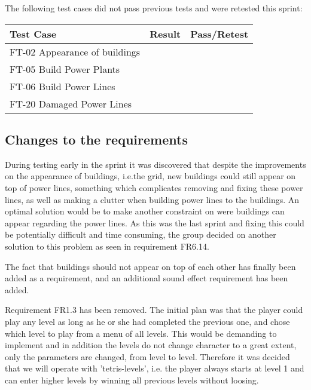 	The following test cases did not pass previous tests and were retested this sprint:

	\begin{tabular}{| p{3cm} | p{7cm} | p{2cm} |}
		\hline
		\rowcolor{lightgray}
		{\bf Test Case} & {\bf Result} & {\bf Pass/Retest} \\ \hline
		FT-02 Appearance of buildings & & \\ \hline
		FT-05 Build Power Plants & & \\ \hline
		FT-06 Build Power Lines & & \\ \hline
		FT-20 Damaged Power Lines & & \\ \hline
	\end{tabular}

\subsection{Changes to the requirements}

	During testing early in the sprint it was discovered that despite the improvements on the appearance of buildings, i.e.the grid, new buildings could still appear on top of power lines, something which complicates removing and fixing these power lines, as well as making a clutter when building power lines to the buildings. An optimal solution would be to make another constraint on were buildings can appear regarding the power lines. As this was the last sprint and fixing this could be potentially difficult and time consuming, the group decided on another solution to this problem as seen  in requirement FR6.14.

	The fact that buildings should not appear on top of each other has finally been added as a requirement, and an additional sound effect requirement has been added.

	Requirement FR1.3 has been removed. The initial plan was that the player could play any level as long as he or she had completed the previous one, and chose which level to play from a menu of all levels. This would be demanding to implement and in addition the levels do not change character to a great extent, only the parameters are changed, from level to level. Therefore it was decided that we will operate with 'tetris-levels', i.e. the player always starts at level 1 and can enter higher levels by winning all previous levels without loosing. 

